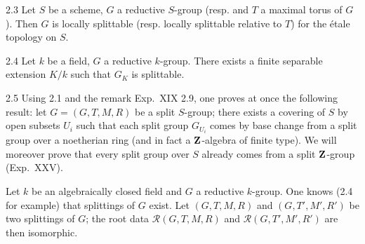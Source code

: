 \begin{corollary}{2.3}\label{XXII.2.3}
Let $S$ be a scheme, $G$ a reductive $S$-group (resp. and $T$ a maximal torus of $G$). Then $G$ is locally splittable (resp. locally splittable relative to $T$) for the \'etale topology on $S$.
\end{corollary}
\begin{corollary}{2.4}\label{XXII.2.4}
Let $k$ be a field, $G$ a reductive $k$-group. There exists a finite separable extension $K/k$ such that $G_K$ is splittable.
\end{corollary}
\begin{remark}{2.5}\label{XXII.2.5}
Using 2.1 and the remark Exp.~XIX 2.9, one proves at once the following result: let $G=(G,T,M,R)$ be a split $S$-group; there exists a covering of $S$ by open subsets $U_i$ such that each split group $G_{U_i}$ comes by base change from a split group over a noetherian ring (and in fact a $\mathbf{Z}$-algebra of finite type). We will moreover prove that every split group over $S$ already comes from a split $\mathbf{Z}$-group (Exp.~XXV).
\end{remark}
\label{XXII.2.6}
Let $k$ be an algebraically closed field and $G$ a reductive $k$-group. One knows (2.4 for example) that splittings of $G$ exist. Let $(G,T,M,R)$ and $(G,T',M',R')$ be two splittings of $G$; the root data $\mathscr R(G,T,M,R)$ and $\mathscr R(G,T',M',R')$ are then isomorphic.

